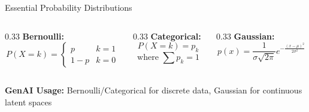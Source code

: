 \documentclass[5pt,aspectratio=169]{beamer}
\begin{document}
\begin{frame}{Essential Probability Distributions}
\begin{columns}[T]
\begin{column}{0.33\textwidth}
\textbf{Bernoulli:}
\[ P(X=k) = \begin{cases}
p & k=1 \\
1-p & k=0
\end{cases} \]
\end{column}

\begin{column}{0.33\textwidth}
\textbf{Categorical:}
\[ P(X=k) = p_k \]
\[ \text{where } \sum p_k = 1 \]
\end{column}

\begin{column}{0.33\textwidth}
\textbf{Gaussian:}
\[ p(x) = \frac{1}{\sigma\sqrt{2\pi}}e^{-\frac{(x-\mu)^2}{2\sigma^2}} \]
\end{column}
\end{columns}

\vspace{0.5cm}
\textbf{GenAI Usage:} Bernoulli/Categorical for discrete data, Gaussian for continuous latent spaces
\end{frame}
\end{document}
